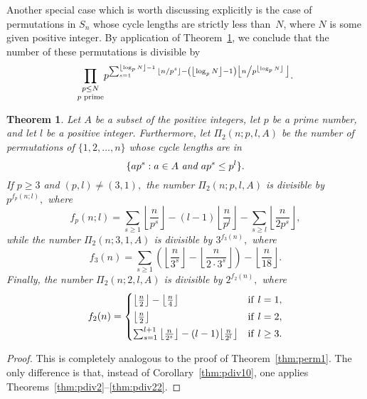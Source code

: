 \documentclass[12pt,reqno]{amsart}
\numberwithin{equation}{section}
\newtheorem{theorem}{Theorem}
\theoremstyle{remark}
\begin{document}
Another special case which is worth discussing explicitly is the
case of permutations in $S_n$ whose cycle lengths are strictly less than~$N$,
where $N$ is some given positive integer. 
By application of Theorem~\ref{thm:perm2}, we conclude
that the number of these permutations is divisible by
$$
\underset{p\text{ prime}}{\prod _{p\le N} ^{}}
p^{\sum_{s=1}^{{\left\lfloor{\log_pN}\right\rfloor}-1}
{\left\lfloor{{n} /{p^{s}}}\right\rfloor}-\left({\left\lfloor{\log_pN}\right\rfloor}-1\right)
{\left\lfloor{ {n} \left/{p^{{\left\lfloor{\log_pN}\right\rfloor}}}\right.}\right\rfloor}}.
$$

\begin{theorem} \label{thm:perm2}
Let\/ $A$ be a subset of the positive integers, 
let $p$ be a prime number, and let $l$ be
a positive integer.
Furthermore, let $\Pi_2(n;p,l,A)$ be the number of permutations
of $\{1,2,\dots,n\}$
whose cycle lengths are in 
\begin{equation} \label{eq:PiA2} 
\{ap^s:a\in A\text{ \em and }ap^s\le p^l\}.
\end{equation}
If $p\ge3$ and $(p,l)\ne(3,1),$ the number
$\Pi_2(n;p,l,A)$ is divisible by $p^{f_p(n;l)},$ where
$$
f_p(n;l)=
\sum_{s\ge1}{\left\lfloor{\frac {n} {p^{s}}}\right\rfloor}
-(l-1){\left\lfloor{\frac {n} {p^l}}\right\rfloor}-\sum_{s \ge l}{\left\lfloor{\frac {n} {2p^{s}}}\right\rfloor},
$$
while the number
$\Pi_2(n;3,1,A)$ is divisible by $3^{f_3(n)},$ where
$$
f_3(n)=
\sum_{s \ge 1}
\left({\left\lfloor{\frac {n} {3^{s}}}\right\rfloor} 
-{\left\lfloor{\frac {n} {2\cdot3^{s}}}\right\rfloor} \right)
-{\left\lfloor{\frac {n} {18}}\right\rfloor} .
$$
Finally, the number
$\Pi_2(n;2,l,A)$ is divisible by $2^{f_2(n)},$ where
$$
f_2(n)=
\begin{cases} 
{\left\lfloor{\frac {n} {2}}\right\rfloor}
-{\left\lfloor{\frac {n} {4}}\right\rfloor}
&\text{if\/ }l=1,\\[1mm]
{\left\lfloor{\frac {n} {2}}\right\rfloor}
&\text{if\/ }l=2,\\[1mm]
\sum_{s=1}^{l+1}{\left\lfloor{\frac {n} {2^{s}}}\right\rfloor}
-(l-1){\left\lfloor{\frac {n} {2^l}}\right\rfloor}
&\text{if\/ }l\ge3.
\end{cases}
$$
\end{theorem}

\begin{proof}
This is completely analogous to the proof of Theorem~\ref{thm:perm1}.
The only difference is that, instead of Corollary~\ref{thm:pdiv10},
one applies Theorems~\ref{thm:pdiv2}--\ref{thm:pdiv22}.
\end{proof}
\end{document}
